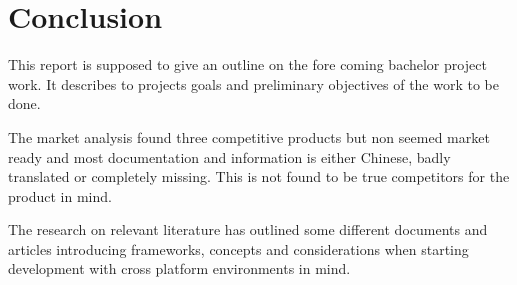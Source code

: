 \begingroup
\renewcommand{\clearpage}{}
\chapter{Conclusion}
\endgroup

This report is supposed to give an outline on the fore coming bachelor project work. It describes to projects goals and preliminary objectives of the work to be done.

The market analysis found three competitive products but non seemed market ready and most documentation and information is either Chinese, badly translated or completely missing. This is not found to be true competitors for the product in mind.

The research on relevant literature has outlined some different documents and articles introducing frameworks, concepts and considerations when starting development with cross platform environments in mind.
